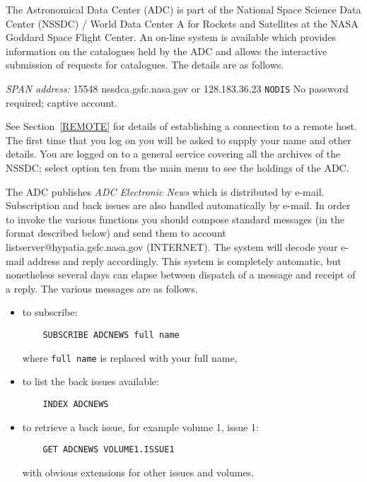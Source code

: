 The Astronomical Data Center (ADC) is part of the National Space
Science Data Center (NSSDC) / World Data Center A for Rockets and 
Satellites at the NASA Goddard Space Flight Center. An on-line system
is available which provides information on the catalogues held by the
ADC and allows the interactive submission of requests for catalogues.
The details are as follows.

{\it SPAN address: } 15548
 nssdca.gsfc.nasa.gov or 128.183.36.23
 \verb-NODIS-
 No password required; captive account.

See Section~\ref{REMOTE} for details of establishing a connection to
a remote host. The first time that you log on you will
be asked to supply your name and other details. You are logged on to a
general service covering all the archives of the NSSDC; select option 
ten from the main menu to see the holdings of the ADC.

The ADC publishes {\it ADC Electronic News} which is distributed by
e-mail. Subscription and back issues are also handled automatically by 
e-mail. In order to invoke the various functions you should compose 
standard messages (in the format described below) and send them to 
account listserver@hypatia.gsfc.nasa.gov (INTERNET). The system will
decode your e-mail address and reply accordingly. This system is 
completely automatic, but nonetheless several days can elapse between
dispatch of a message and receipt of a reply. The various messages are 
as follows.

\begin{itemize}

  \item to subscribe:
  \begin{verbatim}
    SUBSCRIBE ADCNEWS full name
  \end{verbatim}

   where \verb-full name- is replaced with your full name,

  \item to list the back issues available:
  \begin{verbatim}
    INDEX ADCNEWS
  \end{verbatim}

  \item to retrieve a back issue, for example volume 1, issue 1:
  \begin{verbatim}
    GET ADCNEWS VOLUME1.ISSUE1
  \end{verbatim}

   with obvious extensions for other issues and volumes.

\end{itemize}

